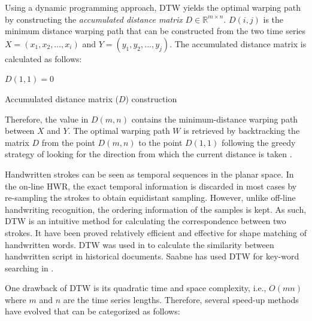 \iftoggle{edit-mode}{\hspace{0pt}\marginpar{Accumulated distance matrix}}{}
Using a dynamic programming approach, DTW yields the optimal warping path by constructing the \emph{accumulated distance matrix} $D \in \mathbb{R}^{m \times n}$. 
$D(i,j)$ is the minimum distance warping path that can be constructed from the two time series $X = \left( {{x_1},{x_2},...,{x_i}} \right)$ and $Y = \left( {{y_1},{y_2},...,{y_j}} \right)$.
The accumulated distance matrix is calculated as follows: 
\begin{algorithm}
$D(1,1) = 0$\;
\caption{Accumulated distance matrix ($D$) construction}
\label{alg:adm_dtw}
\end{algorithm}
Therefore, the value in $D(m,n)$ contains the minimum-distance warping path between $X$ and $Y$.
The optimal warping path $W$ is retrieved by backtracking the matrix $D$ from the point $D(m,n)$ to the point $D(1,1)$ following the greedy strategy of looking for the direction from which the current distance is taken \cite{senin2008dynamic}.

\iftoggle{edit-mode}{\hspace{0pt}\marginpar{stroke trajectories similarity measure using DTW}}{}
Handwritten strokes can be seen as temporal sequences in the planar space. 
In the on-line HWR, the exact temporal information is discarded in most cases by re-sampling the strokes to obtain equidistant sampling. 
However, unlike off-line handwriting recognition, the ordering information of the samples is kept. 
As such, DTW is an intuitive method for calculating the correspondence between two strokes. 
It have been proved relatively efficient and effective for shape matching of handwritten words. 
DTW was used in \cite{rath2003word, rath2003indexing, moghaddam2009application} to calculate the similarity between handwritten script in historical documents. 
Saabne has used DTW for key-word searching in \cite{saabni2011fast, saabni2008keyword}.


\iftoggle{edit-mode}{\hspace{0pt}\marginpar{DTW Speedup}}{}
One drawback of DTW is its quadratic time and space complexity, i.e., $O(mn)$ where $m$ and $n$ are the time series lengths. 
Therefore, several speed-up methods have evolved that can be categorized as follows:

